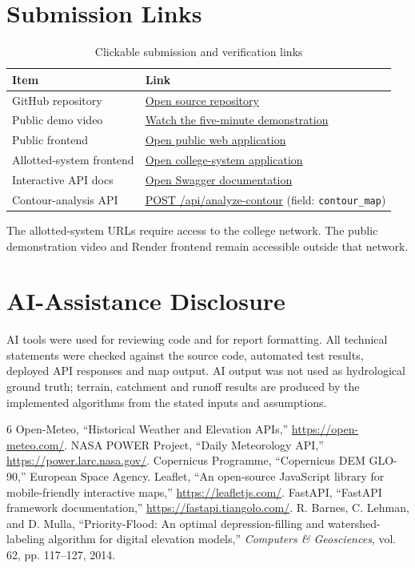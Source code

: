\documentclass[manuscript,screen,review]{acmart}
\begin{document}
\section{Submission Links}
\begin{table}[h]
  \caption{Clickable submission and verification links}
  \label{tab:submission-links}
  \begin{tabular}{p{2.7cm}p{5.6cm}}
    \toprule
    Item & Link \\
    \midrule
    GitHub repository & \href{https://github.com/snehanagmoti/Village-Pond-planning}{Open source repository} \\
    Public demo video & \href{https://youtu.be/Kt8YKtDSnM0}{Watch the five-minute demonstration} \\
    Public frontend & \href{https://sneha-village-pond-planning-2026.onrender.com/}{Open public web application} \\
    Allotted-system frontend & \href{http://10.1.75.53:3238/}{Open college-system application} \\
    Interactive API docs & \href{http://10.1.75.53:3238/docs}{Open Swagger documentation} \\
    Contour-analysis API & \href{http://10.1.75.53:3238/api/analyze-contour}{POST /api/analyze-contour} (field: \texttt{contour\_map}) \\
    \bottomrule
  \end{tabular}
\end{table}
The allotted-system URLs require access to the college network. The public demonstration video and Render frontend remain accessible outside that network.

\section{AI-Assistance Disclosure}
AI tools were used for reviewing code and for report formatting. All technical statements were checked against the source code, automated test results, deployed API responses and map output. AI output was not used as hydrological ground truth; terrain, catchment and runoff results are produced by the implemented algorithms from the stated inputs and assumptions.

\begin{thebibliography}{6}
 Open-Meteo, ``Historical Weather and Elevation APIs,'' \url{https://open-meteo.com/}.
 NASA POWER Project, ``Daily Meteorology API,'' \url{https://power.larc.nasa.gov/}.
 Copernicus Programme, ``Copernicus DEM GLO-90,'' European Space Agency.
 Leaflet, ``An open-source JavaScript library for mobile-friendly interactive maps,'' \url{https://leafletjs.com/}.
 FastAPI, ``FastAPI framework documentation,'' \url{https://fastapi.tiangolo.com/}.
 R. Barnes, C. Lehman, and D. Mulla, ``Priority-Flood: An optimal depression-filling and watershed-labeling algorithm for digital elevation models,'' \emph{Computers \& Geosciences}, vol. 62, pp. 117--127, 2014.
\end{thebibliography}
\end{document}
